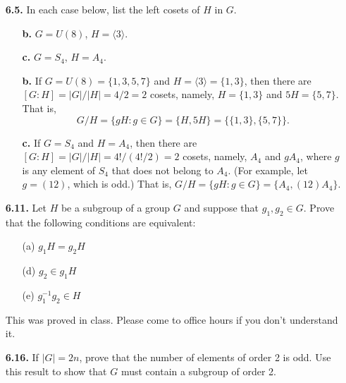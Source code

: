 \documentclass[12pt,reqno]{amsart}
\newcommand{\<}{\ensuremath{\langle}}
\renewcommand{\>}{\ensuremath{\rangle}}
\newcommand{\probskip}{\vskip1cm}
\begin{document}
\begin{enumerate}[{\bf 1.}]
\item[{\bf 6.5.}]
In each case below, list the left cosets of $H$ in $G$.
\begin{enumerate}
\item[{\bf b.}]
$G = U(8)$, $H = \langle 3 \rangle$.
\item[{\bf c.}]
$G = S_4$, $H = A_4$.
\end{enumerate}

\medskip

\begin{enumerate}
\item[{\bf b.}]
If $G = U(8) = \{1, 3, 5, 7\}$ and $H = \langle 3 \rangle = \{1, 3\}$, then
there are $[G:H] = |G|/|H| = 4/2 = 2$ cosets, namely, $H = \{1,3\}$ and 
$5H = \{5, 7\}$. That is, 
\[
G/H =  %
\{gH : g\in G\} = \{ H, 5H\} = \{\{1,3\}, \{5, 7\}\}.
\]
\item[{\bf c.}] 
If $G = S_4$ and $H = A_4$, then there are $[G:H] = |G|/|H| = 4!/(4!/2) = 2$
cosets, namely, $A_4$ and $gA_4$, where $g$ is any element of $S_4$ that does
not belong to $A_4$. (For example, let $g = (12)$, which is odd.)
That is, $G/H %
= \{gH : g\in G\} = \{ A_4, (12)A_4\}$.

\end{enumerate}

\newpage
\item[{\bf 6.11.}] 
Let $H$ be a subgroup of a group $G$ and suppose that $g_1, g_2 \in G$.  Prove
that the following conditions are equivalent: 
\begin{enumerate}
 
\item[(a)]
$g_1 H = g_2 H$
 
\item[(d)]
$g_2 \in g_1 H$
 
\item[(e)]
$g_1^{-1} g_2 \in H$
\end{enumerate}

\medskip

This was proved in class.  Please come to office hours if you don't understand it.

\probskip


 
\item[{\bf 6.16.}] 
If $|G| = 2n$, prove that the number of elements of order 2 is odd.  Use this
result to show that $G$ must contain a subgroup of order 2. 


\end{enumerate}
\end{document}
